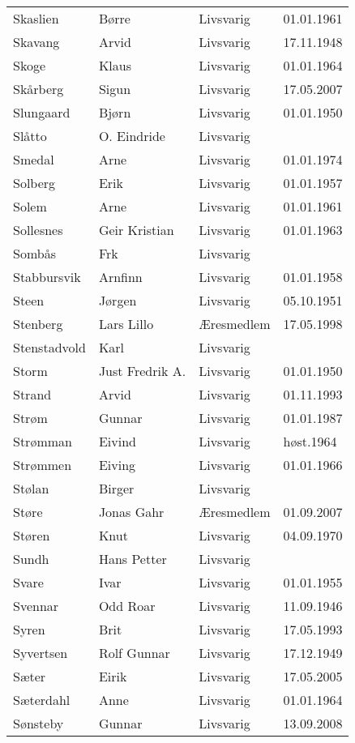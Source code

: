\begin{longtable}{llll}
Skaslien	&	Børre	&	Livsvarig 	&	01.01.1961	\\
Skavang	&	Arvid	&	Livsvarig 	&	17.11.1948	\\
Skoge	&	Klaus	&	Livsvarig 	&	01.01.1964	\\
Skårberg	&	Sigun	&	Livsvarig	&	17.05.2007	\\
Slungaard	&	Bjørn	&	Livsvarig 	&	01.01.1950	\\
Slåtto	&	O. Eindride	&	Livsvarig 	&		\\
Smedal	&	Arne	&	Livsvarig 	&	01.01.1974	\\
Solberg	&	Erik	&	Livsvarig 	&	01.01.1957	\\
Solem	&	Arne	&	Livsvarig 	&	01.01.1961	\\
Sollesnes	&	Geir Kristian	&	Livsvarig 	&	01.01.1963	\\
Sombås	&	Frk	&	Livsvarig 	&		\\
Stabbursvik	&	Arnfinn	&	Livsvarig 	&	01.01.1958	\\
Steen	&	Jørgen	&	Livsvarig 	&	05.10.1951	\\
Stenberg 	&	Lars Lillo 	&	Æresmedlem	&	17.05.1998	\\
Stenstadvold	&	Karl	&	Livsvarig 	&		\\
Storm	&	Just Fredrik A.	&	Livsvarig 	&	01.01.1950	\\
Strand	&	Arvid	&	Livsvarig 	&	01.11.1993	\\
Strøm	&	Gunnar	&	Livsvarig 	&	01.01.1987	\\
Strømman	&	Eivind	&	Livsvarig 	&	høst.1964	\\
Strømmen	&	Eiving	&	Livsvarig 	&	01.01.1966	\\
Stølan	&	Birger	&	Livsvarig 	&		\\
Støre	&	Jonas Gahr	&	Æresmedlem	&	01.09.2007	\\
Støren	&	Knut	&	Livsvarig 	&	04.09.1970	\\
Sundh	&	Hans Petter	&	Livsvarig 	&		\\
Svare	&	Ivar	&	Livsvarig 	&	01.01.1955	\\
Svennar	&	Odd Roar	&	Livsvarig 	&	11.09.1946	\\
Syren	&	Brit	&	Livsvarig 	&	17.05.1993	\\
Syvertsen	&	Rolf Gunnar	&	Livsvarig 	&	17.12.1949	\\
Sæter 	&	Eirik	&	Livsvarig	&	17.05.2005	\\
Sæterdahl	&	Anne	&	Livsvarig 	&	01.01.1964	\\
Sønsteby	&	Gunnar	&	Livsvarig	&	13.09.2008	\\

\end{longtable}
